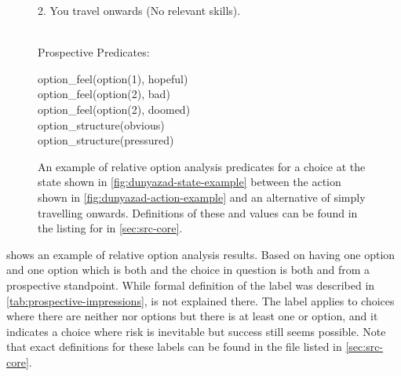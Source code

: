\begin{enumerate}[leftmargin=1.4em]
\begin{figure}[!b]
{{{\begin{hangparas}{1.3em}{1}
2. You travel onwards (No relevant skills).
\end{hangparas}
} \vind \\
Prospective Predicates:\svind \\
\ind \parbox{0.85\textwidth}{ \tt \raggedright
{} option\_feel(option(1), hopeful) \\
 option\_feel(option(2), bad) \\
 option\_feel(option(2), doomed) \\
 option\_structure(obvious) \\
 option\_structure(pressured) \\
}
}
}
\caption[\dunyazad/ relative option analysis example]{An example of relative option analysis predicates for a choice at the state shown in \cref{fig:dunyazad-state-example} between the action shown in \cref{fig:dunyazad-action-example} and an alternative of simply travelling onwards. Definitions of these  and  values can be found in the listing for  in \cref{sec:src-core}.}
\label{fig:dunyazad-relative-option-analysis-example}
\end{figure}


 shows an example of relative option analysis results.
%
Based on having one  option and one option which is both  and  the choice in question is both  and  from a prospective standpoint.
%
While formal definition of the  label was described in \cref{tab:prospective-impressions},  is not explained there.
%
The  label applies to choices where there are neither  nor  options but there is at least one  or  option, and it indicates a choice where risk is inevitable but success still seems possible.
%
Note that exact definitions for these labels can be found in the file  listed in \cref{sec:src-core}.

\begin{figure}[!p]
\centering
{}
\end{figure}
\end{enumerate}
